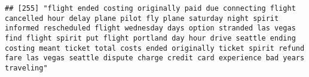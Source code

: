 \documentclass[
]{article}
\begin{document}
\begin{verbatim}
## [255] "flight ended costing originally paid due connecting flight cancelled hour delay plane pilot fly plane saturday night spirit informed rescheduled flight wednesday days option stranded las vegas find flight spirit put flight portland day hour drive seattle ending costing meant ticket total costs ended originally ticket spirit refund fare las vegas seattle dispute charge credit card experience bad years traveling"                                                                                                                                                                                                                                                                                                                                                                                                                                                                                                                                                                                                                                                                                                                                                                                                                                                                                                                                                                                                                                                                                                                                                                                                                                                                                                                                                                 

\end{verbatim}
\end{document}
